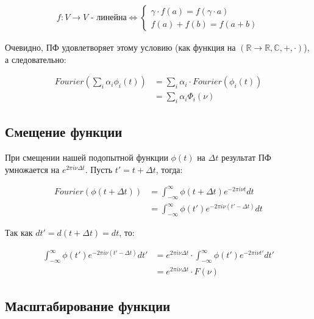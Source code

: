 \documentclass[a4paper,12pt]{report}
\begin{document}
    \[
        \begin{aligned}
            f: V \rightarrow V \text{ - линейна}
            \Longleftrightarrow
            \begin{cases}
                    \gamma\cdot f(a) = f(\gamma\cdot a) \\
                    f(a) + f(b) = f(a + b)
            \end{cases}
        \end{aligned}
    \]
    
    Очевидно, ПФ удовлетворяет этому условию (как функция на $(\mathbb{R} \rightarrow \mathbb{R},\mathbb{C},+,\cdot)$), а следовательно:
    
    \[
        \begin{aligned}
            Fourier\left(\sum_{i}\alpha_i\phi_i(t)\right)
            &= \sum_{i}\alpha_i \cdot Fourier(\phi_i(t)) \\
            &= \sum_{i}\alpha_i \Phi_i(\nu)
        \end{aligned}
    \]
    
    \subsection{Смещение функции}
    
    При смещении нашей подопытной функции $\phi(t)$ на $\Delta t$ результат ПФ умножается на $e^{2\pi i \nu\Delta t}$. Пусть $t' = t + \Delta t$, тогда:
    
    \[
        \begin{aligned}
            Fourier\left(\phi(t + \Delta t)\right)
            &= \int_{-\infty}^{\infty} \phi(t + \Delta t) e^{-2\pi i\nu t} dt \\
            &= \int_{-\infty}^{\infty} \phi(t') e^{-2\pi i\nu (t' - \Delta t)} dt
        \end{aligned}
    \]
    
    Так как $dt' = d(t + \Delta t) = dt$, то:
    
    \[
        \begin{aligned}
            \int_{-\infty}^{\infty} \phi(t') e^{-2\pi i\nu (t' - \Delta t)} dt'
            &= e^{2\pi i\nu\Delta t} \cdot \int_{-\infty}^{\infty} \phi(t') e^{-2\pi i\nu t'} dt' \\
            &= e^{2\pi i\nu\Delta t} \cdot F(\nu)
        \end{aligned}
    \]
    
    \subsection{Масштабирование функции}
    
\end{document}
